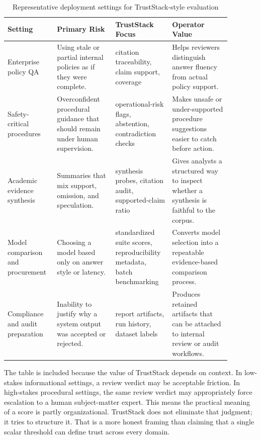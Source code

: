 \documentclass[conference]{IEEEtran}
\begin{document}
\begin{table}[t]
  \caption{Representative deployment settings for TrustStack-style evaluation}
  \label{tab:deployment-settings}
  \centering
  \begin{tabular}{p{0.18\linewidth}p{0.24\linewidth}p{0.22\linewidth}p{0.24\linewidth}}
    \toprule
    \rowcolor{TrustStackBlue!12}
    \textcolor{TrustStackBlue}{Setting} & \textcolor{TrustStackBlue}{Primary Risk} & \textcolor{TrustStackBlue}{TrustStack Focus} & \textcolor{TrustStackBlue}{Operator Value} \\
    \midrule
    Enterprise policy QA & Using stale or partial internal policies as if they were complete. & citation traceability, claim support, coverage & Helps reviewers distinguish answer fluency from actual policy support. \\
    Safety-critical procedures & Overconfident procedural guidance that should remain under human supervision. & operational-risk flags, abstention, contradiction checks & Makes unsafe or under-supported procedure suggestions easier to catch before action. \\
    Academic evidence synthesis & Summaries that mix support, omission, and speculation. & synthesis probes, citation audit, supported-claim ratio & Gives analysts a structured way to inspect whether a synthesis is faithful to the corpus. \\
    Model comparison and procurement & Choosing a model based only on answer style or latency. & standardized suite scores, reproducibility metadata, batch benchmarking & Converts model selection into a repeatable evidence-based comparison process. \\
    Compliance and audit preparation & Inability to justify why a system output was accepted or rejected. & report artifacts, run history, dataset labels & Produces retained artifacts that can be attached to internal review or audit workflows. \\
    \bottomrule
  \end{tabular}
\end{table}

The table is included because the value of TrustStack depends on context. In low-stakes informational settings, a review verdict may be acceptable friction. In high-stakes procedural settings, the same review verdict may appropriately force escalation to a human subject-matter expert. This means the practical meaning of a score is partly organizational. TrustStack does not eliminate that judgment; it tries to structure it. That is a more honest framing than claiming that a single scalar threshold can define trust across every domain.
\end{document}
